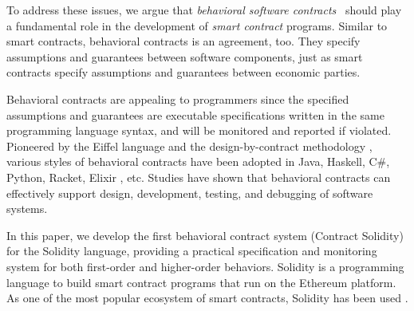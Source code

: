 To address these issues, we argue that \emph{behavioral software
contracts}~\cite{DBLP:conf/tools/Meyer98a} should play a fundamental role in
the development of \emph{smart contract} programs.
Similar to smart contracts, behavioral contracts is an agreement, too. They
specify assumptions and guarantees between software components, just as
smart contracts specify assumptions and guarantees between economic parties.

Behavioral contracts are appealing to programmers since the specified
assumptions and guarantees are executable specifications written in the same
programming language syntax, and will be monitored and reported if violated.
Pioneered by the Eiffel language \cite{DBLP:books/ph/Meyer91} and the
design-by-contract methodology \cite{DBLP:conf/tools/Meyer98a,
DBLP:books/ph/Meyer97}, various styles of behavioral contracts have been
adopted in Java, Haskell, C\#, Python, Racket, Elixir
\cite{DBLP:conf/erlang/0001BBHMEF22}, etc. 
Studies \cite{DBLP:conf/rodin/Chalin06, DBLP:books/ph/Meyer97}
have shown that behavioral contracts can effectively support design, development,
testing, and debugging of software systems.

In this paper, we develop the first behavioral contract system \lang (Contract
Solidity) for the Solidity language, providing a practical specification and
monitoring system for both first-order and higher-order behaviors.
Solidity is a programming language to build smart contract programs that run on
the Ethereum platform.  As one of the most popular ecosystem of smart
contracts, Solidity has been used .



